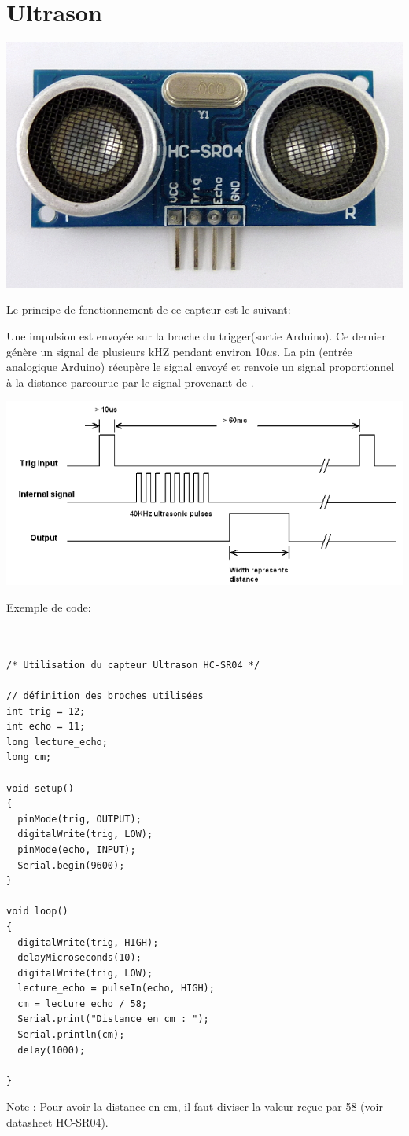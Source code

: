 \documentclass{eurobot_report}
\begin{document}
\section{Ultrason}

\includegraphics{assets/ultrason}

Le principe de fonctionnement de ce capteur est le suivant:

Une impulsion est envoyée sur la broche du trigger(sortie Arduino). Ce dernier génère un signal de plusieurs kHZ pendant environ 10$\mu$s. La pin  (entrée analogique Arduino) récupère le signal envoyé et renvoie un signal proportionnel à la distance parcourue par le signal provenant de .

\includegraphics{assets/graphic-ultrason}

Exemple de code:

\begin{verbatim}


/* Utilisation du capteur Ultrason HC-SR04 */

// définition des broches utilisées
int trig = 12;
int echo = 11;
long lecture_echo;
long cm;

void setup()
{
  pinMode(trig, OUTPUT);
  digitalWrite(trig, LOW);
  pinMode(echo, INPUT);
  Serial.begin(9600);
}

void loop()
{
  digitalWrite(trig, HIGH);
  delayMicroseconds(10);
  digitalWrite(trig, LOW);
  lecture_echo = pulseIn(echo, HIGH);
  cm = lecture_echo / 58;
  Serial.print("Distance en cm : ");
  Serial.println(cm);
  delay(1000);

}

\end{verbatim}

Note : Pour avoir la distance en cm, il faut diviser la valeur reçue par 58 (voir datasheet HC-SR04).
\end{document}
